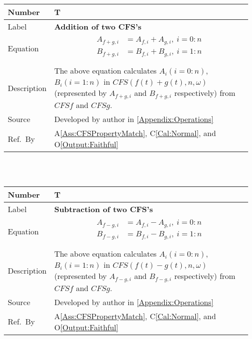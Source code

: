\documentclass[12pt]{article}
\newcommand{\colAwidth}{0.13\textwidth}
\newcommand{\colBwidth}{0.82\textwidth}
\newcounter{theorynum} %
\newcommand{\aref}[1]{A\ref{#1}}
\newcommand{\calref}[1]{C\ref{#1}}
\newcommand{\oref}[1]{O\ref{#1}}
\begin{document}
~\newline
\noindent
\begin{minipage}{\textwidth}
	\renewcommand*{\arraystretch}{1.5}
	\begin{tabular}{| p{\colAwidth} | p{\colBwidth}|}
		\hline
		\rowcolor[gray]{0.9}
		Number& T{theorynum}\thetheorynum 
		\label{T:Addition}\\
		\hline
		Label&\bf Addition of two CFS's\\
		\hline
		Equation&  
		\begin{equation}
		\begin{aligned}
		A_{f+g, i}&=A_{f, i} + A_{g, i},~i=0:n\\
		B_{f+g, i}&=B_{f, i} + B_{g, i},~i=1:n\\
		\end{aligned}
		\end{equation}\\
		\hline
		Description & The above equation calculates $A_i (i=0:n)$, $B_i(i=1:n)$ in $\mathit{CFS}(f(t)+g(t), n, \omega)$ (represented by $A_{f+g, i}$ and $B_{f+g, i}$ respectively) from $\mathit{CFSf}$ and $\mathit{CFSg}$.\\
		
		\hline
		Source & Developed by author in \autoref{Appendix:Operations}\\
		\hline
		Ref.\ By & \aref{Ass:CFSPropertyMatch}, \calref{Cal:Normal}, 
		and \oref{Output:Faithful}\\
		\hline
	\end{tabular}
\end{minipage}\\
~\newline
\noindent
\begin{minipage}{\textwidth}
	\renewcommand*{\arraystretch}{1.5}
	\begin{tabular}{| p{\colAwidth} | p{\colBwidth}|}
		\hline
		\rowcolor[gray]{0.9}
		Number& T{theorynum}\thetheorynum 
		\label{T:Subtraction}\\
		\hline
		Label&\bf Subtraction of two CFS's\\
		\hline
		Equation&  
		\begin{equation}
		\begin{aligned}
		A_{f-g, i}
		&=A_{f, i} - A_{g, i},~i=0:n\\
		B_{f-g, i}
		&=B_{f, i} - B_{g, i},~i=1:n\\
		\end{aligned}
		\end{equation}\\
		\hline
		Description & The above equation calculates 
		$A_i(i=0:n)$, $B_i(i=1:n)$ in 
		$\mathit{CFS}(f(t)-g(t), n, \omega)$ 
		(represented by $A_{f-g, i}$ and $B_{f-g, i}$ respectively) 
		from $\mathit{CFSf}$ and $\mathit{CFSg}$.\\
		\hline
		Source & Developed by author in \autoref{Appendix:Operations}\\
		\hline
		Ref.\ By & \aref{Ass:CFSPropertyMatch}, \calref{Cal:Normal}, 
		and \oref{Output:Faithful}\\
		\hline
	\end{tabular}
\end{minipage}\\
\end{document}
